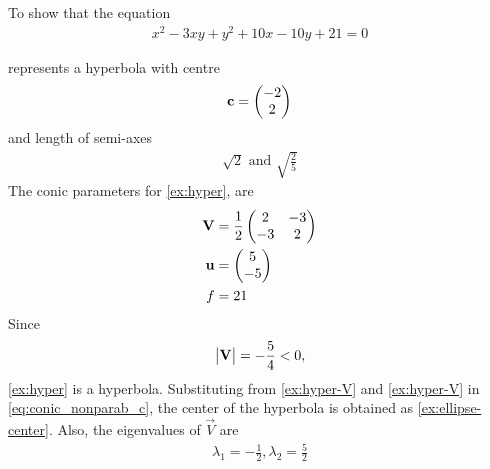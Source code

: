 \begin{example}[hyperbola]
To show that the equation 
	\begin{align}
\label{ex:hyper} 
		x^2 - 3xy + y^2+10x-10y+21=0
	\end{align}
\end{example}
%
represents a hyperbola with centre
	\begin{align}
		\mathbf{c} = \begin{pmatrix}-2 \\ 2\end{pmatrix}
	\end{align}
	and length of semi-axes
	\begin{align}
		\label{eq:hyper-semi-axis}
		\sqrt{2} \text{ and } \sqrt{\frac{2}{5}}
	\end{align}
\solution   The conic parameters for
\eqref{ex:hyper}, 
are 
\begin{align}
	    \label{ex:hyper-V}
	\mathbf{V} &=\frac{1}{2}\begin{pmatrix}2 & - {3}\\- {3} & 2\end{pmatrix}
\\
	    \label{ex:hyper-u}
	\mathbf{u} &= \begin{pmatrix}5\\-5\end{pmatrix}
\\
f &= 21
	    \label{ex:hyper-f}
    \end{align}
    Since 
    \begin{align}
	    \begin{vmatrix}\mathbf{V}\end{vmatrix}  =  - \frac{5}{4} < 0,
    \end{align}
\eqref{ex:hyper} is a hyperbola.  
Substituting from 
	    \eqref{ex:hyper-V}
	    and 
	    \eqref{ex:hyper-V}
	    in
    \eqref{eq:conic_nonparab_c},
the center of the hyperbola is obtained as 
	    \eqref{ex:ellipse-center}.
Also, the eigenvalues of 
$\vec{V}$
are 
\begin{align}
	\lambda_1 = - \frac{1}{2}, 	\lambda_2 =
 \frac{5}{2}
	    \label{ex:hyper-lam}
    \end{align}

